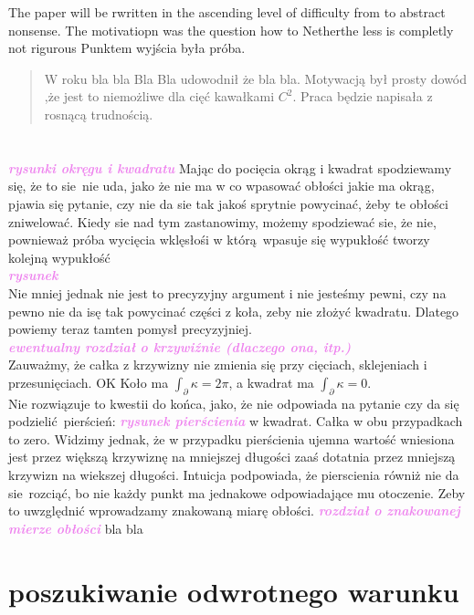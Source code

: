 \documentclass[a4paper, 12pt]{article}
\newcommand{\content}[1]{\hfill \break \textbf{\large \textcolor{violet}{#1} \hfill \break}\normalsize}
\begin{document}
The paper will be rwritten in the ascending level of difficulty from to abstract
nonsense.
The motivatiopn was the question how to
Netherthe less is completly not rigurous
Punktem wyjścia była próba.



\begin{abstract}
W roku bla bla Bla Bla udowodnił że bla bla. Motywacją był prosty dowód ,że jest to niemożliwe dla cięć
kawałkami $C^2$. Praca będzie napisała z rosnącą trudnością.
\end{abstract}
\section{}
\content{\textit{rysunki okręgu i kwadratu}}
Mając do pocięcia okrąg i kwadrat spodziewamy się, że to sie nie uda, jako że nie ma w co wpasować
obłości jakie ma okrąg, pjawia się pytanie, czy nie da sie tak jakoś sprytnie powycinać, żeby te obłości
zniwelować. Kiedy sie nad tym zastanowimy, możemy spodziewać sie, że nie, pownieważ próba wycięcia wklęsłośi
w którą wpasuje się wypukłość tworzy kolejną wypukłość \\
\content{\textit{rysunek}} \\
Nie mniej jednak nie jest to precyzyjny argument i nie jesteśmy pewni, czy na pewno nie da isę tak powycinać
części z koła, zeby nie złożyć kwadratu.
Dlatego powiemy teraz tamten pomysł precyzyjniej. \\
\content{\textit{ewentualny rozdział o krzywiźnie (dlaczego ona, itp.) }} \\
Zauważmy, że całka z krzywizny nie zmienia się przy cięciach, sklejeniach i przesunięciach.
OK
Koło ma $\displaystyle\int_{\partial} \kappa = 2 \pi$, a kwadrat ma $\displaystyle\int  _{\partial} \kappa
= 0$. \\
Nie rozwiązuje to kwestii do końca, jako, że nie odpowiada na pytanie czy da się podzielić pierścień:
\content{\textit{rysunek pierścienia}}
w kwadrat. Całka w obu przypadkach to zero. Widzimy jednak, że w przypadku pierścienia ujemna wartość
wniesiona jest przez większą krzywiznę na mniejszej długości zaaś dotatnia przez mniejszą krzywizn na
wiekszej długości. Intuicja podpowiada, że pierscienia równiż nie da sie rozciąć, bo nie każdy punkt ma
jednakowe odpowiadające mu otoczenie. Zeby to uwzględnić wprowadzamy znakowaną miarę obłości.
\content{\textit{rozdział o znakowanej mierze obłości}}
bla bla
\section{poszukiwanie odwrotnego warunku}
\end{document}
